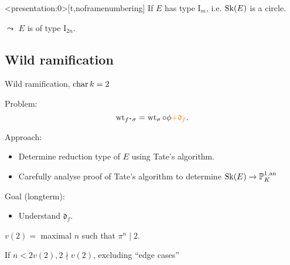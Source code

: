 \begin{frame}<presentation:0>[t,noframenumbering]
	If $E$ has type $\mathrm I_m$, i.e. $\operatorname{Sk}(E)$ is a circle.
	\begin{figure}
	\end{figure}
	\pause
    $\leadsto$ $E$ is of type $\mathrm I_{2n}$.
\end{frame}

\subsection{Wild ramification} \label{sec:wild_ramification}

\begin{frame}
	{Wild ramification, $\operatorname{char} k = 2$}

	Problem: \[
		\operatorname{wt}_{f^*\sigma} = \operatorname{wt}_{\sigma} \circ \phi {\color{orange} +  \mathfrak{d} _f}
	.\] 
	\medskip

	\pause

	Approach:
	\begin{itemize}
		\item Determine reduction type of $E $ using Tate's algorithm.
		\item Carefully analyse proof of Tate's algorithm to determine $\operatorname{Sk}(E) \to \mathbb P^{1, \text{an}}_{K}$
	\end{itemize}
	\pause 
	\bigskip

	Goal (longterm):
	\begin{itemize}
		\item Understand $\mathfrak{d} _f$.
	\end{itemize}
\end{frame}
\begin{frame}
	$v(2) =$ maximal $n$ such that $\pi^{n} \mid 2$.  

\begin{figure}[ht]
    \centering
\end{figure}

\end{frame}
\begin{frame}
	If $n < 2v(2), 2 \nmid v(2)$, excluding ``edge cases''
\begin{figure}[ht]
    \centering
\end{figure}
\end{frame}

